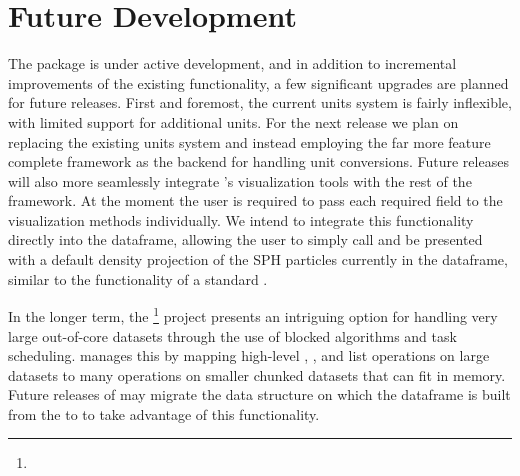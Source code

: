 \section{Future Development}
\label{sec:future}
The  package is under active development, and in addition to incremental improvements of the existing functionality, a few significant upgrades are planned for future releases.  
First and foremost, the current  units system is fairly inflexible, with limited support for additional units.  
For the next release we plan on replacing the existing units system and instead employing the far more feature complete  framework \citep{Robitailleetal2013} as the backend for handling unit conversions. 
Future releases will also more seamlessly integrate 's visualization tools with the rest of the framework.  
At the moment the user is required to pass each required field to the visualization methods individually.
We intend to integrate this functionality directly into the  dataframe, allowing the user to simply call  and be presented with a default density projection of the SPH particles currently in the dataframe, similar to the  functionality of a standard .

In the longer term, the \footnote{} project presents an intriguing option for handling very large out-of-core datasets through the use of blocked algorithms and task scheduling.
 manages this by mapping high-level , , and list operations on large datasets to many operations on smaller chunked datasets that can fit in memory.  
Future releases of  may migrate the data structure on which the  dataframe is built from the  to  to take advantage of this functionality.